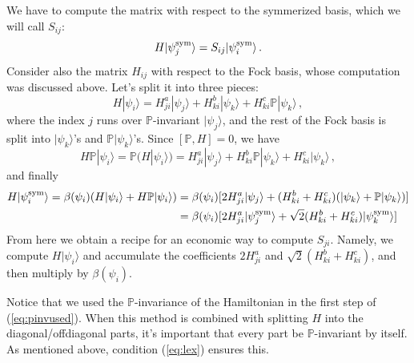 \documentclass[11pt]{article}
\newcommand{\reef}[1]{(\ref{#1})}
\newcommand{\beq}{\begin{equation}}
\newcommand{\eeq}{\end{equation}}
\def\nn{\nonumber}
\def\calE {{\cal E}}
\def\bP {\mathbb{P}}
\newcommand{\ket}[1]{|#1\rangle}
\numberwithin{equation}{section}
\begin{document}
We have to compute the matrix with respect to the symmerized basis, which we will call $S_{ij}$:
\beq
H\ket{\psi_j^{\sym}}=S_{ij}\ket{\psi_{i}^\sym}\,.
\eeq
Consider also the matrix $H_{ij}$ with respect to the Fock basis, whose computation was discussed above. Let's split it into three pieces:
\beq
H\ket{\psi_i}=H^a_{ji}\ket{\psi_j}+H^b_{ki}\ket{\psi_k}+H^c_{ki}\bP\ket{\psi_k}\,,
\eeq
where the index $j$ runs over $\bP$-invariant $\ket{\psi_j}$, and the rest of the Fock basis is split into $\ket{\psi_k}$'s and $\bP\ket{\psi_k}$'s. Since $[\bP,H]=0$, we have
\beq
\label{eq:pinvused}
H \bP\ket{\psi_i}=\bP(H \ket{\psi_i})= H^a_{ji}\ket{\psi_j}+H^b_{ki}\bP\ket{\psi_k}+H^c_{ki}\ket{{\psi_k}}\,,
\eeq
and finally
\begin{align}
H \ket{\psi^\sym_i}=\beta(\psi_i)(H \ket{\psi_i}+ H \bP\ket{\psi_i})&= \beta(\psi_i) [2H^a_{ji}\ket{\psi_j}+
(H^b_{ki}+H^c_{ki})(\ket{\psi_k}+\bP\ket{\psi_k})]\nn
\\
&=\beta(\psi_i)  [2H^a_{ji}\ket{\psi^\sym_j}+
\sqrt{2}(H^b_{ki}+H^c_{ki})\ket{\psi^\sym_k}]
\end{align}
From here we obtain a recipe for an economic way to compute $S_{ji}$. 
Namely, we compute $H\ket{\psi_i}$ and accumulate the coefficients $2H^a_{ji}$ and $\sqrt{2}(H^b_{ki}+H^c_{ki})$,
and then multiply by $\beta(\psi_i)$. 

Notice that we used the $\bP$-invariance of the Hamiltonian in the first step of \reef{eq:pinvused}. When this method is combined with splitting $H$ into the diagonal/offdiagonal parts, it's important that every part be $\bP$-invariant by itself.
As mentioned above, condition \reef{eq:lex} ensures this.

%
%
\end{document}
